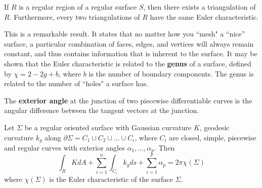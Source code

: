\begin{theorem}[]\label{}
If $R$ is a regular region of a regular surface $S$, then there exists a triangulation of $R$. Furthermore, every two triangulations of $R$ have the same Euler characteristic.
\end{theorem}

This is a remarkable result. It states that no matter how you ``mesh" a ``nice'' surface, a particular combination of faces, edges, and vertices will always remain constant, and thus contains information that is inherent to the surface. It may be shown that the Euler characteristic is related to the \textbf{genus} of a surface, defined by $\chi = 2 - 2g + b$, where $b$ is the number of boundary components. The genus is related to the number of ``holes" a surface has.

\begin{definition}[]\label{}
The \textbf{exterior angle} at the junction of two piecewise differentiable curves is the angular difference between the tangent vectors at the junction.
\end{definition}



%
\begin{theorem}\label{thm:gauss-bonnet}
Let $\Sigma$ be a regular oriented surface with Gaussian curvature $K$, geodesic curvature $k_g$ along $\partial \Sigma = C_1 \cup C_2 \cup \ldots \cup C_i$, where $C_i$ are closed, simple, piecewise and regular curves with exterior angles $\alpha_1, \ldots, \alpha_p$. Then
\begin{equation}\label{eq:gauss-bonnet}
\int_R K dA + \sum_{i=1}^n \int_{C_i} k_g ds + \sum_{i=1}^p \alpha_p = 2 \pi \chi(\Sigma)
\end{equation}
where $\chi(\Sigma)$ is the Euler characteristic of the surface $\Sigma$.
\end{theorem}

